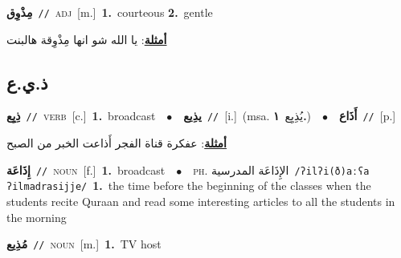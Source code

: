 \documentclass[10pt,a4paper,twoside]{article} %
\begin{document}
\begin{multicols}{2}
{{{{{{{{{{\setlength\topsep{0pt}\textbf{\foreignlanguage{arabic}{مِذْوِق}}\ {\color{gray}\texttt{//}\color{black}}\ \textsc{adj}\ [m.]\ \textbf{1.}~courteous  \textbf{2.}~gentle\  \begin{flushright}\color{gray}\foreignlanguage{arabic}{\textbf{\underline{\foreignlanguage{arabic}{أمثلة}}}: يا الله شو انها مِذْوِقة هالبنت}\end{flushright}\color{black}} \vspace{2mm}

\vspace{-3mm}
\subsection*{\color{blue}\foreignlanguage{arabic}{ذ.ي.ع}\color{blue}{}} 

{\setlength\topsep{0pt}\textbf{\foreignlanguage{arabic}{ذِيِع}}\ {\color{gray}\texttt{//}\color{black}}\ \textsc{verb}\ [c.]\ \textbf{1.}~broadcast\ \ $\bullet$\ \ \setlength\topsep{0pt}\textbf{\foreignlanguage{arabic}{يذِيع}}\ {\color{gray}\texttt{//}\color{black}}\ [i.]\ \color{gray}(msa. \foreignlanguage{arabic}{يُذِيِع}~\foreignlanguage{arabic}{\textbf{١.}})\color{black}\ \ $\bullet$\ \ \setlength\topsep{0pt}\textbf{\foreignlanguage{arabic}{أَذَاع}}\ {\color{gray}\texttt{//}\color{black}}\ [p.]\  \begin{flushright}\color{gray}\foreignlanguage{arabic}{\textbf{\underline{\foreignlanguage{arabic}{أمثلة}}}: عفكرة قناة الفجر أَذاعت الخبر من الصبح}\end{flushright}\color{black}} \vspace{2mm}

{\setlength\topsep{0pt}\textbf{\foreignlanguage{arabic}{إِذَاعَة}}\ {\color{gray}\texttt{//}\color{black}}\ \textsc{noun}\ [f.]\ \textbf{1.}~broadcast\ \ $\bullet$\ \ \textsc{ph.} \color{gray} \foreignlanguage{arabic}{الإِذَاعَة المدرسية}\color{black}\ {\color{gray}\texttt{/{\sffamily ʔilʔi(ð)aːʕa ʔilmadrasijje}/}\color{black}}\ \textbf{1.}~the time before the beginning of the classes when the students recite Quraan and read some interesting articles to all the students in the morning\ 

{\setlength\topsep{0pt}\textbf{\foreignlanguage{arabic}{مُذِيع}}\ {\color{gray}\texttt{//}\color{black}}\ \textsc{noun}\ [m.]\ \textbf{1.}~TV host\ 

}}}}}}}}}}}
\end{multicols}
\end{document}
